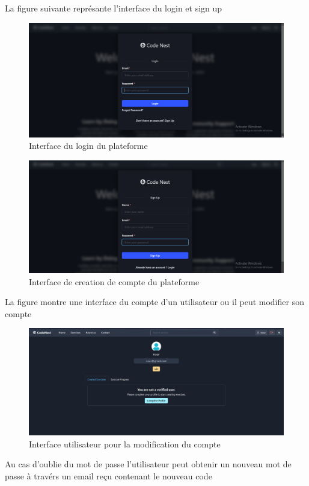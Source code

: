 \clearpage 
La figure suivante représante  l'interface du login et sign up  
\begin{figure}[h!]
    \centering
    \includegraphics[width=0.9\linewidth]{pages/images/interface login.png}
    \caption{Interface du login du plateforme}
    \label{fig:enter-label}
\end{figure}


\begin{figure}[h!]
    \centering
    \includegraphics[width=0.9\linewidth]{pages/images/sign up interface.png}
    \caption{Interface de creation de compte du plateforme}
    \label{fig:enter-label}
\end{figure}

\clearpage
La figure montre une interface du compte  d'un utilisateur ou il peut modifier son compte
\begin{figure}[h!]
    \centering
    \includegraphics[width=0.9\linewidth]{pages/images/modifier compte.png }
    \caption{Interface utilisateur pour la modification du compte}
    \label{fig:enter-label}
\end{figure}
Au cas d'oublie du mot de passe l'utilisateur peut obtenir un nouveau mot de passe à travérs un email reçu contenant le nouveau code 


